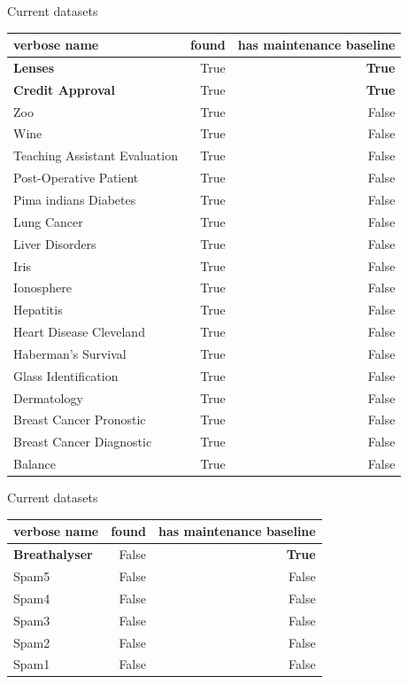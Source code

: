 \documentclass[]{beamer}
\begin{document}
\begin{frame}{Current datasets}
    \centering
    \smaller
    \begin{tabular}{lrr}
        \toprule
        verbose name & found & has maintenance baseline \\\midrule
        \textbf{Lenses} & True & \textbf{True} \\
        \textbf{Credit Approval} & True & \textbf{True} \\
        Zoo & True & False \\
        Wine & True & False \\
        Teaching Assistant Evaluation & True & False \\
        Post-Operative Patient & True & False \\
        Pima indians Diabetes & True & False \\
        Lung Cancer & True & False \\
        Liver Disorders & True & False \\
        Iris & True & False \\
        Ionosphere & True & False \\
        Hepatitis & True & False \\
        Heart Disease Cleveland & True & False \\
        Haberman's Survival & True & False \\
        Glass Identification & True & False \\
        Dermatology & True & False \\
        Breast Cancer Pronostic & True & False \\
        Breast Cancer Diagnostic & True & False \\
        Balance & True & False \\\bottomrule
    \end{tabular}
\end{frame}
\begin{frame}{Current datasets}
    \centering
    \begin{tabular}{lrr}
        \toprule
        verbose name & found & has maintenance baseline \\\midrule
        \textbf{Breathalyser} & False & \textbf{True} \\
        Spam5 & False & False \\
        Spam4 & False & False \\
        Spam3 & False & False \\
        Spam2 & False & False \\
        Spam1 & False & False \\\bottomrule
    \end{tabular}
\end{frame}
\end{document}
